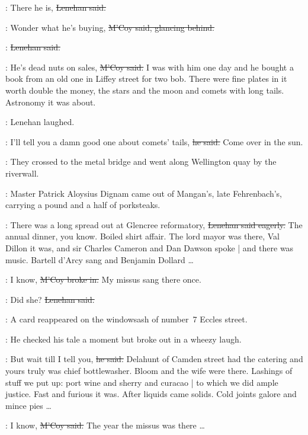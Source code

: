\lenehan:
There he is,
\sout{Lenehan said.}

\mcoy:
Wonder what he's buying,
\sout{M'Coy said,
glancing behind.}

\lenehan:
\sout{Lenehan said.}

\mcoy:
He's dead nuts on sales,
\sout{M'Coy said.}
I was with him one day
and he bought a book 
from an old one in Liffey street for two bob.
There were fine plates in it worth double the money,
the stars and the moon and comets with long tails.
Astronomy it was about.

:
Lenehan laughed.

\lenehan:
I'll tell you a damn good one about comets' tails,
\sout{he said.}
Come over in the sun.

:
They crossed to the metal bridge
and went along Wellington quay by the riverwall.

\begin{interject}
    :
    Master Patrick Aloysius Dignam came out of Mangan's,
    late Fehrenbach's,
    carrying a pound and a half of porksteaks.
\end{interject}

\lenehan:
There was a long spread out at Glencree reformatory,
\sout{Lenehan said eagerly.}
The annual dinner, you know.
Boiled shirt affair.
The lord mayor was there,
Val Dillon it was,
and sir Charles Cameron and Dan Dawson spoke |
and there was music.
Bartell d'Arcy sang and Benjamin Dollard \ldots

\mcoy:
I know,
\sout{M'Coy broke in.}
My missus sang there once.

\lenehan:
Did she?
\sout{Lenehan said.}

\begin{interject}
    :
    A card  reappeared
    on the windowsash of number~7 Eccles street.
\end{interject}

:
He checked his tale a moment
but broke out in a wheezy laugh.

\lenehan:
But wait till I tell you,
\sout{he said.}
Delahunt of Camden street had the catering
and yours truly was chief bottlewasher.
Bloom and the wife were there.
Lashings of stuff we put up:
port wine and sherry and curacao |
to which we did ample justice.
Fast and furious it was.
After liquids came solids.
Cold joints galore and mince pies \ldots

\mcoy:
I know,
\sout{M'Coy said.}
The year the missus was there \ldots

